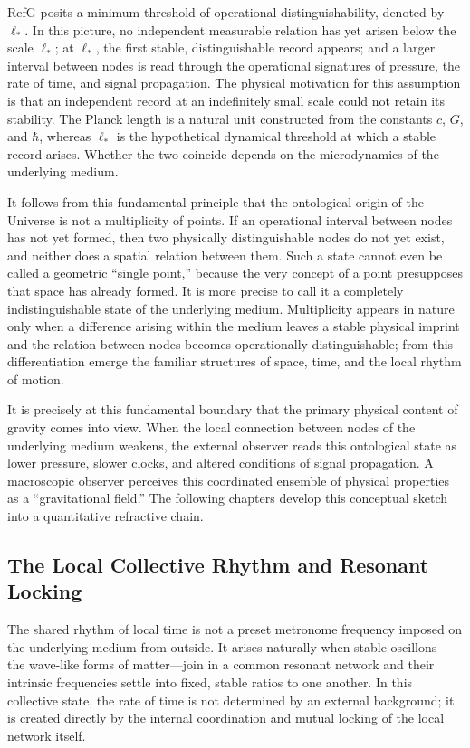 \documentclass[11pt,a4paper]{article}
\begin{document}
RefG posits a minimum threshold of operational distinguishability, denoted by $\ell_*$. In this picture, no independent measurable relation has yet arisen below the scale $\ell_*$; at $\ell_*$, the first stable, distinguishable record appears; and a larger interval between nodes is read through the operational signatures of pressure, the rate of time, and signal propagation. The physical motivation for this assumption is that an independent record at an indefinitely small scale could not retain its stability. The Planck length is a natural unit constructed from the constants $c$, $G$, and $\hbar$, whereas $\ell_*$ is the hypothetical dynamical threshold at which a stable record arises. Whether the two coincide depends on the microdynamics of the underlying medium.

It follows from this fundamental principle that the ontological origin of the Universe is not a multiplicity of points. If an operational interval between nodes has not yet formed, then two physically distinguishable nodes do not yet exist, and neither does a spatial relation between them. Such a state cannot even be called a geometric ``single point,'' because the very concept of a point presupposes that space has already formed. It is more precise to call it a completely indistinguishable state of the underlying medium. Multiplicity appears in nature only when a difference arising within the medium leaves a stable physical imprint and the relation between nodes becomes operationally distinguishable; from this differentiation emerge the familiar structures of space, time, and the local rhythm of motion.

It is precisely at this fundamental boundary that the primary physical content of gravity comes into view. When the local connection between nodes of the underlying medium weakens, the external observer reads this ontological state as lower pressure, slower clocks, and altered conditions of signal propagation. A macroscopic observer perceives this coordinated ensemble of physical properties as a ``gravitational field.'' The following chapters develop this conceptual sketch into a quantitative refractive chain.

\subsection{The Local Collective Rhythm and Resonant Locking}

The shared rhythm of local time is not a preset metronome frequency imposed on the underlying medium from outside. It arises naturally when stable oscillons---the wave-like forms of matter---join in a common resonant network and their intrinsic frequencies settle into fixed, stable ratios to one another. In this collective state, the rate of time is not determined by an external background; it is created directly by the internal coordination and mutual locking of the local network itself.
\end{document}
